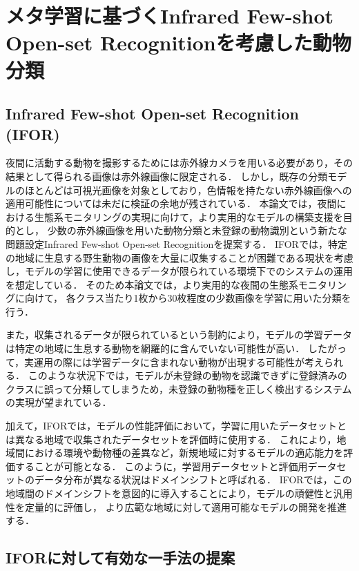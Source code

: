 
\chapter{メタ学習に基づくInfrared Few-shot Open-set Recognitionを考慮した動物分類}

\section{Infrared Few-shot Open-set Recognition (IFOR)}
\label{sec:ifor}

夜間に活動する動物を撮影するためには赤外線カメラを用いる必要があり，その結果として得られる画像は赤外線画像に限定される．
しかし，既存の分類モデルのほとんどは可視光画像を対象としており，色情報を持たない赤外線画像への適用可能性については未だに検証の余地が残されている．
本論文では，夜間における生態系モニタリングの実現に向けて，より実用的なモデルの構築支援を目的とし，
少数の赤外線画像を用いた動物分類と未登録の動物識別という新たな問題設定Infrared Few-shot Open-set Recognitionを提案する．
IFORでは，特定の地域に生息する野生動物の画像を大量に収集することが困難である現状を考慮し，モデルの学習に使用できるデータが限られている環境下でのシステムの運用を想定している．
そのため本論文では，より実用的な夜間の生態系モニタリングに向けて，
各クラス当たり1枚から30枚程度の少数画像を学習に用いた分類を行う．

また，収集されるデータが限られているという制約により，モデルの学習データは特定の地域に生息する動物を網羅的に含んでいない可能性が高い．
したがって，実運用の際には学習データに含まれない動物が出現する可能性が考えられる．
このような状況下では，モデルが未登録の動物を認識できずに登録済みのクラスに誤って分類してしまうため，未登録の動物種を正しく検出するシステムの実現が望まれている．

加えて，IFORでは，モデルの性能評価において，学習に用いたデータセットとは異なる地域で収集されたデータセットを評価時に使用する．
これにより，地域間における環境や動物種の差異など，新規地域に対するモデルの適応能力を評価することが可能となる．
このように，学習用データセットと評価用データセットのデータ分布が異なる状況はドメインシフトと呼ばれる．
IFORでは，この地域間のドメインシフトを意図的に導入することにより，モデルの頑健性と汎用性を定量的に評価し，
より広範な地域に対して適用可能なモデルの開発を推進する．

\section{IFORに対して有効な一手法の提案}
\label{sec:detection_approach}

